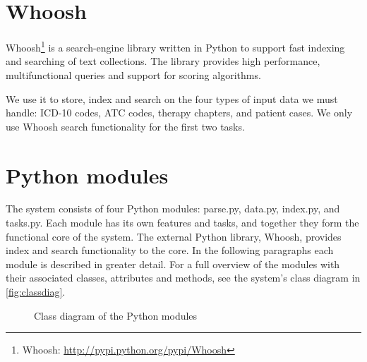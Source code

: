 \section{Whoosh}
Whoosh\footnote{Whoosh: \url{http://pypi.python.org/pypi/Whoosh}} is a
search-engine library written in Python to support fast indexing and searching
of text collections. The library provides high performance, multifunctional
queries and support for scoring algorithms.

We use it to store, index and search on the four types of input data we must
handle: ICD-10 codes, ATC codes, therapy chapters, and patient cases. We only
use Whoosh search functionality for the first two tasks.


\section{Python modules}
The system consists of four Python modules: parse.py, data.py, index.py, and tasks.py. Each module has its own features and tasks, and together they form the functional core of the system. The external Python library, Whoosh, provides index and search functionality to the core. In the following paragraphs each module is described in greater detail. For a full overview of the modules with their associated classes, attributes and methods, see the system's class diagram in \autoref{fig:classdiag}.

\begin{figure}[tbp]
	\noindent{}
	\caption{Class diagram of the Python modules\label{fig:classdiag}}
\end{figure}

